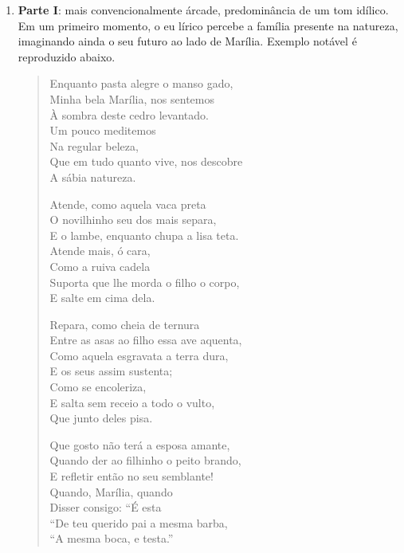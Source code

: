 \begin{enumerate}
\item \textbf{Parte I}: mais convencionalmente árcade, predominância de um tom idílico. Em um primeiro momento, o eu lírico percebe a família presente na natureza, imaginando ainda o seu futuro ao lado de Marília. Exemplo notável é reproduzido abaixo.
\begin{verse}
Enquanto pasta alegre o manso gado, \\
Minha bela Marília, nos sentemos \\
À sombra deste cedro levantado. \\
\hspace{2em} Um pouco meditemos \\
\hspace{2em} Na regular beleza, \\
Que em tudo quanto vive, nos descobre \\
\hspace{2em} A sábia natureza.
						
Atende, como aquela vaca preta \\
O novilhinho seu dos mais separa, \\
E o lambe, enquanto chupa a lisa teta. \\
\hspace{2em} Atende mais, ó cara, \\
\hspace{2em} Como a ruiva cadela \\
Suporta que lhe morda o filho o corpo, \\
\hspace{2em} E salte em cima dela.
						
Repara, como cheia de ternura \\
Entre as asas ao filho essa ave aquenta, \\
Como aquela esgravata a terra dura, \\
\hspace{2em} E os seus assim sustenta; \\
\hspace{2em} Como se encoleriza, \\
E salta sem receio a todo o vulto, \\
\hspace{2em} Que junto deles pisa.
						
Que gosto não terá a esposa amante, \\
Quando der ao filhinho o peito brando, \\
E refletir então no seu semblante! \\
\hspace{2em} Quando, Marília, quando \\
\hspace{2em} Disser consigo: “É esta \\
“De teu querido pai a mesma barba, \\
\hspace{2em} “A mesma boca, e testa.”
						

\end{verse}
\end{enumerate}
